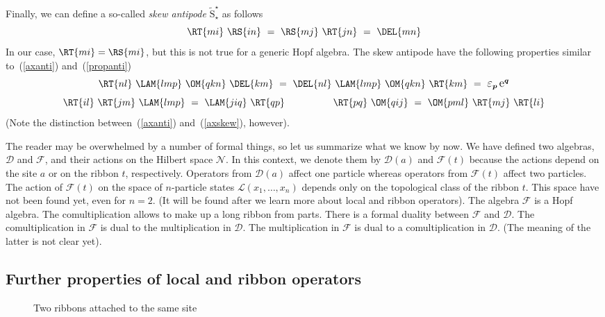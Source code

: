 \documentclass[12pt]{article}
\newcommand*{\epsfscale}[1]{\def\epsfsize##1##2{#1##1}}
\newcommand{\Eps}{\mbox{\large$\varepsilon$}}
\newcommand{\rE}{\mbox{\large$\mathrm e$}}
\newcommand{\rT}{\tilde{\mathrm{S}}}
\newcommand*{\boldind}[1]{{\mbox{\scriptsize\boldmath$#1$}}}
\newcommand*{\EPS}[1]{\Eps_\boldind{#1}}
\newcommand*{\RE}[1]{\rE^\boldind{#1}}
\newcommand{\calD}{\mathcal{D}}
\newcommand{\calF}{\mathcal{F}}
\newcommand{\calL}{\mathcal{L}}
\newcommand{\calN}{\mathcal{N}}
\begin{document}
Finally, we can define a so-called \emph{skew antipode} $\rT^\star_\star$ as 
follows
\begin{equation} \label{skew}
  \RT{mi}\ \RS{in}\ =\ \RS{mj}\ \RT{jn}\ =\ \DEL{mn}
\end{equation}
In our case, $\RT{mi}=\RS{mi}$, but this is not true for a generic Hopf
algebra. The skew antipode have the following properties similar 
to~(\ref{axanti}) and~(\ref{propanti})
\begin{equation} \label{axskew}
  \RT{nl}\ \LAM{lmp}\ \OM{qkn}\ \DEL{km}\ =\ 
  \DEL{nl}\ \LAM{lmp}\ \OM{qkn}\ \RT{km}\ =\ \EPS{p}\,\RE{q}
\end{equation}
\begin{equation} \label{propskew}
  \RT{il}\ \RT{jm}\ \LAM{lmp}\ =\ \LAM{jiq}\ \RT{qp} \qquad\qquad\quad
  \RT{pq}\ \OM{qij}\ =\ \OM{pml}\ \RT{mj}\ \RT{li}
\end{equation}
(Note the distinction between~(\ref{axanti}) and~(\ref{axskew}), however).

The reader may be overwhelmed by a number of formal things, so let us
summarize what we know by now. We have defined two algebras, $\calD$ and
$\calF$, and their actions on the Hilbert space $\calN$. In this context, we
denote them by $\calD(a)$ and $\calF(t)$ because the actions depend on the
site $a$ or on the ribbon $t$, respectively. Operators from $\calD(a)$ affect
one particle whereas operators from $\calF(t)$ affect two particles. The
action of $\calF(t)$ on the space of $n$-particle states
$\calL(x_1,\ldots,x_n)$ depends only on the topological class of the ribbon
$t$. This space have not been found yet, even for $n=2$. (It will be found
after we learn more about local and ribbon operators). The algebra $\calF$ is
a Hopf algebra. The comultiplication allows to make up a long ribbon from
parts. There is a formal duality between $\calF$ and $\calD$. The
comultiplication in $\calF$ is dual to the multiplication in $\calD$. The
multiplication in $\calF$ is dual to a comultiplication in $\calD$. (The
meaning of the latter is not clear yet).


\subsection{Further properties of local and ribbon operators} 
\label{sec_further}

\begin{figure}[t]
\centerline{\epsfscale{0.6}}
\caption{Two ribbons attached to the same site}
\label{fig_commute1}
\end{figure}
\end{document}

